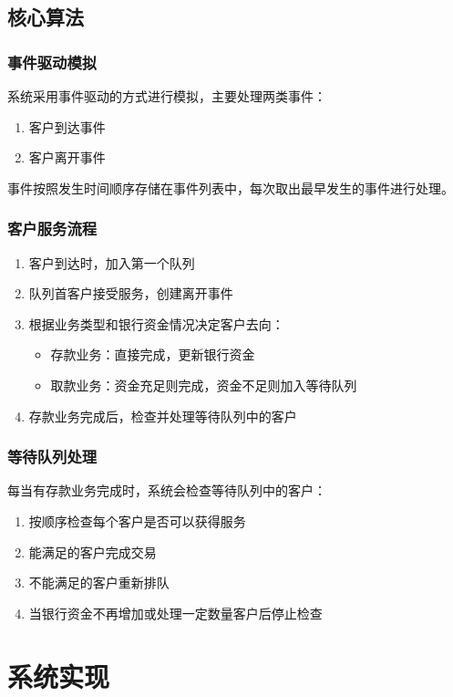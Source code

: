 \documentclass[12pt,a4paper]{article}
\begin{document}
\subsection{核心算法}
\subsubsection{事件驱动模拟}
系统采用事件驱动的方式进行模拟，主要处理两类事件：
\begin{enumerate}
\item 客户到达事件
\item 客户离开事件
\end{enumerate}

事件按照发生时间顺序存储在事件列表中，每次取出最早发生的事件进行处理。

\subsubsection{客户服务流程}
\begin{enumerate}
\item 客户到达时，加入第一个队列
\item 队列首客户接受服务，创建离开事件
\item 根据业务类型和银行资金情况决定客户去向：
  \begin{itemize}
  \item 存款业务：直接完成，更新银行资金
  \item 取款业务：资金充足则完成，资金不足则加入等待队列
  \end{itemize}
\item 存款业务完成后，检查并处理等待队列中的客户
\end{enumerate}

\subsubsection{等待队列处理}
每当有存款业务完成时，系统会检查等待队列中的客户：
\begin{enumerate}
\item 按顺序检查每个客户是否可以获得服务
\item 能满足的客户完成交易
\item 不能满足的客户重新排队
\item 当银行资金不再增加或处理一定数量客户后停止检查
\end{enumerate}

\section{系统实现}
\end{document}
